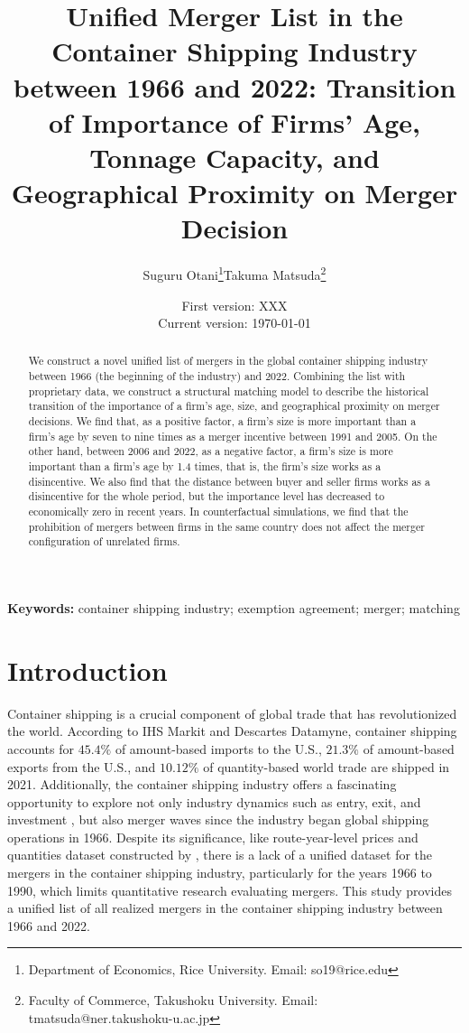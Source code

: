 \documentclass[10pt]{article}
\title{Unified Merger List in the Container Shipping Industry between 1966 and 2022: Transition of Importance of Firms' Age, Tonnage Capacity, and Geographical Proximity on Merger Decision}
\author{Suguru Otani\thanks{Department of Economics, Rice University. Email: so19@rice.edu}\quad  Takuma Matsuda\thanks{Faculty of Commerce, Takushoku University. Email: tmatsuda@ner.takushoku-u.ac.jp}}
\date{
First version: XXX\\
Current version: \today
}
\begin{document}
\maketitle

\begin{abstract}
We construct a novel unified list of mergers in the global container shipping industry between 1966  (the beginning of the industry) and 2022. Combining the list with proprietary data, we construct a structural matching model \citep{fox2018qe} to describe the historical transition of the importance of a firm's age, size, and geographical proximity on merger decisions. 
We find that, as a positive factor, a firm's size is more important than a firm's age by seven to nine times as a merger incentive between 1991 and 2005.
On the other hand, between 2006 and 2022, as a negative factor, a firm's size is more important than a firm's age by 1.4 times, that is, the firm's size works as a disincentive.
We also find that the distance between buyer and seller firms works as a disincentive for the whole period, but the importance level has decreased to economically zero in recent years. 
In counterfactual simulations, we find that the prohibition of mergers between firms in the same country does not affect the merger configuration of unrelated firms.
\end{abstract} 

\vspace{0.1in}
\noindent\textbf{Keywords:} container shipping industry; exemption agreement;  merger; matching 
\vspace{0in}


\section{Introduction}

Container shipping is a crucial component of global trade that has revolutionized the world. 
According to IHS Markit and Descartes Datamyne, container shipping accounts for $45.4 \%$ of amount-based imports to the U.S., $21.3 \%$ of amount-based exports from the U.S., and $10.12 \%$ of quantity-based world trade are shipped in 2021. 
Additionally, the container shipping industry offers a fascinating opportunity to explore not only industry dynamics such as entry, exit, and investment \citep{otani2023industry}, but also merger waves since the industry began global shipping operations in 1966. 
Despite its significance, like route-year-level prices and quantities dataset constructed by \cite{matsuda2022unified}, there is a lack of a unified dataset for the mergers in the container shipping industry, particularly for the years 1966 to 1990, which limits quantitative research evaluating mergers. 
This study provides a unified list of all realized mergers in the container shipping industry between 1966 and 2022.
\end{document}
